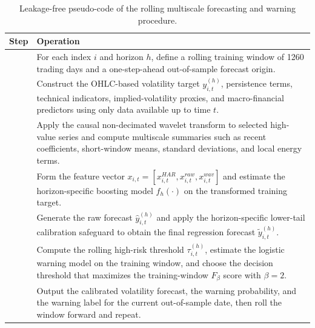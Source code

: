 \begin{table}[!t]
\caption{Leakage-free pseudo-code of the rolling multiscale forecasting and warning procedure.}
\label{tab:pseudocode}
\centering
\small
\setlength{\tabcolsep}{5pt}
\renewcommand{\arraystretch}{1.12}
\begin{tabularx}{\textwidth}{>{\raggedright\arraybackslash}p{}X}
\toprule
Step & Operation \\
\midrule
1 & For each index \(i\) and horizon \(h\), define a rolling training window of 1260 trading days and a one-step-ahead out-of-sample forecast origin. \\
2 & Construct the OHLC-based volatility target \(y_{i,t}^{(h)}\), persistence terms, technical indicators, implied-volatility proxies, and macro-financial predictors using only data available up to time \(t\). \\
3 & Apply the causal non-decimated wavelet transform to selected high-value series and compute multiscale summaries such as recent coefficients, short-window means, standard deviations, and local energy terms. \\
4 & Form the feature vector \(x_{i,t}=[x_{i,t}^{HAR},x_{i,t}^{raw},x_{i,t}^{wav}]\) and estimate the horizon-specific boosting model \(f_h(\cdot)\) on the transformed training target. \\
5 & Generate the raw forecast \(\hat y_{i,t}^{(h)}\) and apply the horizon-specific lower-tail calibration safeguard to obtain the final regression forecast \(\tilde y_{i,t}^{(h)}\). \\
6 & Compute the rolling high-risk threshold \(\tau_{i,t}^{(h)}\), estimate the logistic warning model on the training window, and choose the decision threshold that maximizes the training-window \(F_{\beta}\) score with \(\beta=2\). \\
7 & Output the calibrated volatility forecast, the warning probability, and the warning label for the current out-of-sample date, then roll the window forward and repeat. \\
\bottomrule
\end{tabularx}
\end{table}
